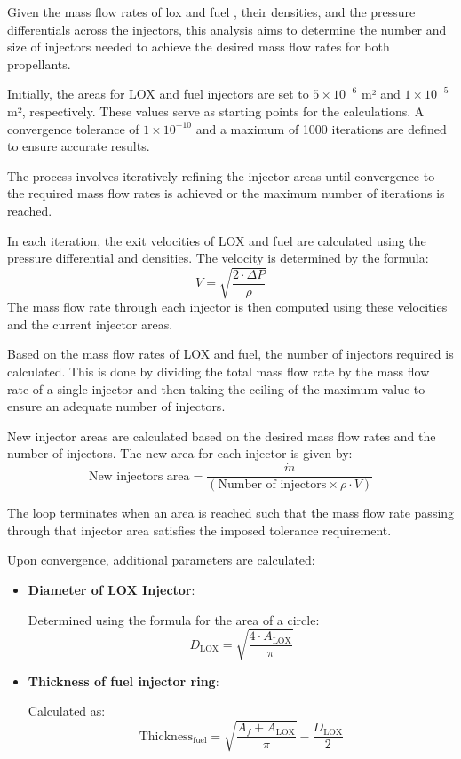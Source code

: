 Given the mass flow rates of \acrfull{lox} and fuel \cite{presentation}, their densities, and the pressure differentials across the injectors, this analysis aims to determine the number and size of injectors needed to achieve the desired mass flow rates for both propellants.

Initially, the areas for LOX and fuel injectors are set to \(5 \times 10^{-6}\) m² and \(1 \times 10^{-5}\) m², respectively. These values serve as starting points for the calculations. A convergence tolerance of \(1 \times 10^{-10}\) and a maximum of 1000 iterations are defined to ensure accurate results.

The process involves iteratively refining the injector areas until convergence to the required mass flow rates is achieved or the maximum number of iterations is reached.


In each iteration, the exit velocities of LOX and fuel are calculated using the pressure differential and densities. The velocity is determined by the formula:
\begin{equation}
V = \sqrt{\frac{2 \cdot \Delta P}{\rho}}
\end{equation}
The mass flow rate through each injector is then computed using these velocities and the current injector areas.

Based on the mass flow rates of LOX and fuel, the number of injectors required is calculated.
This is done by dividing the total mass flow rate by the mass flow rate of a single injector and then taking the ceiling of the maximum value to ensure an adequate number of injectors.

New injector areas are calculated based on the desired mass flow rates and the number of injectors.
The new area for each injector is given by:
\begin{equation}
\text{New injectors area} = \frac{\dot{m}}{(\text{Number of injectors} \times \rho \cdot V)}
\end{equation}

The loop terminates when an area is reached such that the mass flow rate passing through that injector area satisfies the imposed tolerance requirement.

Upon convergence, additional parameters are calculated:
\begin{itemize}
    \item \textbf{Diameter of LOX Injector}: 
    
    Determined using the formula for the area of a circle: \begin{equation}
D_{\text{LOX}} = \sqrt{\frac{4 \cdot A_{\text{LOX}}}{\pi}}
\end{equation}
    \item \textbf{Thickness of fuel injector ring}: 
    
    Calculated as: \begin{equation}
\text{Thickness}_{\text{fuel}} = \sqrt{\frac{A_f + A_{\text{LOX}}}{\pi}} - \frac{D_{\text{LOX}}}{2}
\end{equation}
\end{itemize}

